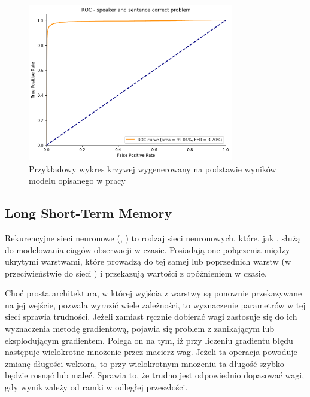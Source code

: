 \begin{figure}[H]
    \centering
    \includegraphics[width=0.8\textwidth]{images/2_2_b_roc_example}
    \caption{Przykładowy wykres krzywej  wygenerowany na podstawie wyników modelu  opisanego w pracy}
    \label{fig:2_2_b_roc_example}
\end{figure}

\subsection{Long Short-Term Memory}

Rekurencyjne sieci neuronowe (, ) to rodzaj sieci neuronowych,
które, jak , służą do modelowania ciągów obserwacji w czasie. Posiadają one połączenia między
ukrytymi warstwami, które prowadzą do tej samej lub poprzednich warstw
(w przeciwieństwie do sieci ) i przekazują wartości z opóźnieniem
w czasie\cite{onTheDifficulty}.

Choć prosta architektura, w której wyjścia z warstwy są ponownie przekazywane na jej wejście, pozwala
wyrazić wiele zależności, to wyznaczenie parametrów w tej sieci sprawia trudności. Jeżeli zamiast
ręcznie dobierać wagi zastosuje się do ich wyznaczenia metodę gradientową, pojawia się problem
z zanikającym lub eksplodującym gradientem. Polega on na tym, iż przy liczeniu gradientu błędu
następuje wielokrotne mnożenie przez macierz wag. Jeżeli ta operacja powoduje zmianę długości
wektora, to przy wielokrotnym mnożeniu ta długość szybko będzie rosnąć lub maleć. Sprawia to,
że trudno jest odpowiednio dopasować wagi, gdy wynik zależy od ramki w odległej przeszłości.

